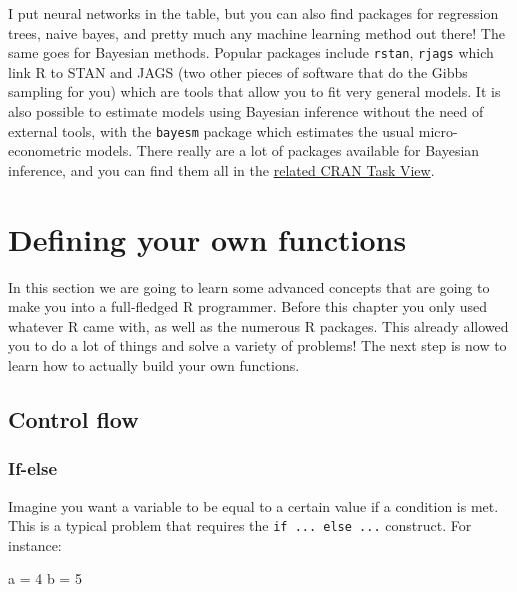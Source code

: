 \documentclass[]{gitbook}
\newenvironment{Shaded}{\begin{snugshade}}{\end{snugshade}}
\newcommand{\DecValTok}[1]{\textcolor[rgb]{0.00,0.00,0.81}{#1}}
\newcommand{\NormalTok}[1]{#1}
\newcommand{\StringTok}[1]{\textcolor[rgb]{0.31,0.60,0.02}{#1}}
\theoremstyle{definition}
\theoremstyle{definition}
\theoremstyle{definition}
\theoremstyle{remark}
\begin{document}
I put neural networks in the table, but you can also find packages for
regression trees, naive bayes, and pretty much any machine learning
method out there! The same goes for Bayesian methods. Popular packages
include \texttt{rstan}, \texttt{rjags} which link R to STAN and JAGS
(two other pieces of software that do the Gibbs sampling for you) which
are tools that allow you to fit very general models. It is also possible
to estimate models using Bayesian inference without the need of external
tools, with the \texttt{bayesm} package which estimates the usual
micro-econometric models. There really are a lot of packages available
for Bayesian inference, and you can find them all in the
\href{https://cran.r-project.org/web/views/Bayesian.html}{related CRAN
Task View}.

\hypertarget{defining-your-own-functions}{%
\section{Defining your own
functions}\label{defining-your-own-functions}}

In this section we are going to learn some advanced concepts that are
going to make you into a full-fledged R programmer. Before this chapter
you only used whatever R came with, as well as the numerous R packages.
This already allowed you to do a lot of things and solve a variety of
problems! The next step is now to learn how to actually build your own
functions.

\hypertarget{control-flow}{%
\subsection{Control flow}\label{control-flow}}

\hypertarget{if-else}{%
\subsubsection{If-else}\label{if-else}}

Imagine you want a variable to be equal to a certain value if a
condition is met. This is a typical problem that requires the
\texttt{if\ ...\ else\ ...} construct. For instance:

\begin{Shaded}
\begin{Highlighting}[]
\NormalTok{a =}\StringTok{ }\DecValTok{4}
\NormalTok{b =}\StringTok{ }\DecValTok{5}
\end{Highlighting}
\end{Shaded}
\end{document}
